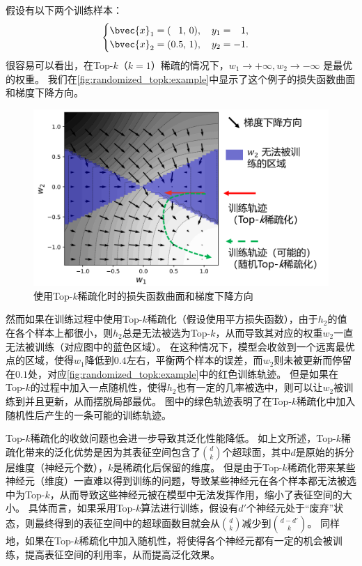假设有以下两个训练样本：
\begin{equation}
\begin{cases}
    \bvec{x}_1 = (\phantom{0.}1, \, 0), \quad y_1 = \phantom{-}1, \\
    \bvec{x}_2 = (          0.5, \, 1), \quad y_2 = -1.
\end{cases}
\end{equation}
%
很容易可以看出，在Top-$k$（$k=1$）稀疏的情况下，$w_1 \to +\infty, w_2 \to -\infty$ 是最优的权重。
%
我们在\autoref{fig:randomized_topk:example}中显示了这个例子的损失函数曲面和梯度下降方向。


\begin{figure}[htbp]
    \centering
    \includegraphics[width=0.75\linewidth]{Z_Resources/randtopk_example.png}
    \caption{使用Top-$k$稀疏化时的损失函数曲面和梯度下降方向}
    \label{fig:randomized_topk:example}
\end{figure}



然而如果在训练过程中使用Top-$k$稀疏化（假设使用平方损失函数），由于$h_2$的值在各个样本上都很小，则$h_2$总是无法被选为Top-$k$，从而导致其对应的权重$w_2$一直无法被训练（对应图中的蓝色区域）。
%
在这种情况下，模型会收敛到一个远离最优点的区域，使得$w_1$降低到$0.4$左右，平衡两个样本的误差，而$w_2$则未被更新而停留在$0.1$处，对应\autoref{fig:randomized_topk:example}中的红色训练轨迹。
%
但是如果在Top-$k$的过程中加入一点随机性，使得$h_2$也有一定的几率被选中，则可以让$w_2$被训练到并且更新，从而摆脱局部最优。
图中的绿色轨迹表明了在Top-$k$稀疏化中加入随机性后产生的一条可能的训练轨迹。


Top-$k$稀疏化的收敛问题也会进一步导致其泛化性能降低。
%
如上文所述，Top-$k$稀疏化带来的泛化优势是因为其表征空间包含了$d \choose k$个超球面，其中$d$是原始的拆分层维度（神经元个数），$k$是稀疏化后保留的维度。
%
但是由于Top-$k$稀疏化带来某些神经元（维度）一直难以得到训练的问题，导致某些神经元在各个样本都无法被选中为Top-$k$，从而导致这些神经元被在模型中无法发挥作用，缩小了表征空间的大小。
%
具体而言，如果采用Top-$k$算法进行训练，假设有$d'$个神经元处于“废弃”状态，则最终得到的表征空间中的超球面数目就会从$d \choose k$减少到$d - d' \choose k$。
%
同样地，如果在Top-$k$稀疏化中加入随机性，将使得各个神经元都有一定的机会被训练，提高表征空间的利用率，从而提高泛化效果。


